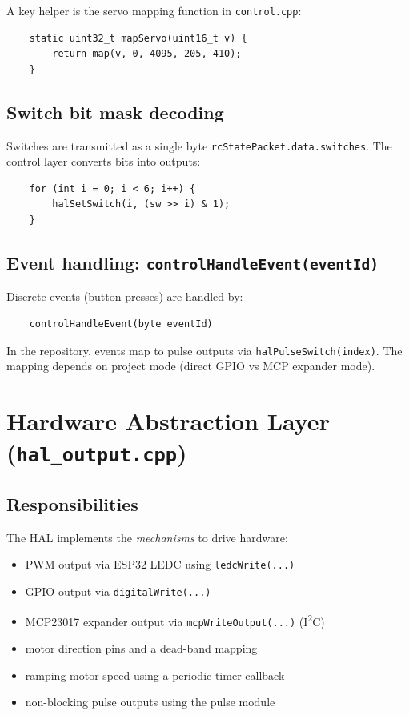 A key helper is the servo mapping function in \texttt{control.cpp}:

\begin{verbatim}
    static uint32_t mapServo(uint16_t v) {
        return map(v, 0, 4095, 205, 410);
    }
\end{verbatim}

\subsection{Switch bit mask decoding}
\label{subsec:control-hal-switch-mask}

Switches are transmitted as a single byte \texttt{rcStatePacket.data.switches}.
The control layer converts bits into outputs:

\begin{verbatim}
    for (int i = 0; i < 6; i++) {
        halSetSwitch(i, (sw >> i) & 1);
    }
\end{verbatim}

\subsection{Event handling: \texttt{controlHandleEvent(eventId)}}
\label{subsec:control-hal-events}

Discrete events (button presses) are handled by:

\begin{verbatim}
    controlHandleEvent(byte eventId)
\end{verbatim}

In the repository, events map to pulse outputs via \texttt{halPulseSwitch(index)}. The mapping depends on
project mode (direct GPIO vs MCP expander mode).

\section{Hardware Abstraction Layer (\texttt{hal\_output.cpp})}
\label{sec:control-hal-hal-layer}

\subsection{Responsibilities}
\label{subsec:control-hal-hal-resp}

The HAL implements the \emph{mechanisms} to drive hardware:

\begin{itemize}
    \item PWM output via ESP32 LEDC using \texttt{ledcWrite(...)}
    \item GPIO output via \texttt{digitalWrite(...)}
    \item MCP23017 expander output via \texttt{mcpWriteOutput(...)} (I\textsuperscript{2}C)
    \item motor direction pins and a dead-band mapping
    \item ramping motor speed using a periodic timer callback
    \item non-blocking pulse outputs using the pulse module
\end{itemize}

